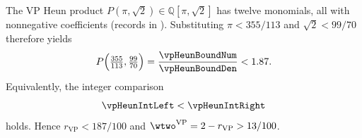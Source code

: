 The VP Heun product $P(\pi,\sqrt{2})\in\mathbb{Q}[\pi,\sqrt{2}]$ has twelve monomials, all with nonnegative coefficients (records in ). Substituting $\pi<355/113$ and $\sqrt{2}<99/70$ therefore yields
\[
P\Bigl(\tfrac{355}{113},\tfrac{99}{70}\Bigr)=\frac{\vpHeunBoundNum}{\vpHeunBoundDen}<1.87.
\]
Equivalently, the integer comparison
\[
\vpHeunIntLeft<\vpHeunIntRight
\]
holds. Hence $r_{\mathrm{VP}}<187/100$ and $\wtwo^{\mathrm{VP}}=2-r_{\mathrm{VP}}>13/100$.
